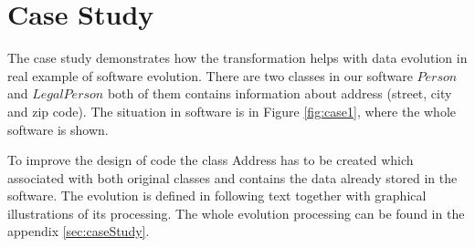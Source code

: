 \documentclass[11pt]{article}
\begin{document}
 
\section{Case Study}
The case study demonstrates how the transformation helps with data evolution in real example of software evolution. There are two classes in our software $Person$ and $LegalPerson$ both of them contains information about address (street, city and zip code). The situation in software is in Figure \ref{fig:case1}, where the whole software is shown. 

To improve the design of code the class Address has to be created which associated with both original classes and contains the data already stored in the software. The evolution is defined in following text together with graphical illustrations of its processing. The whole evolution processing can be found in the appendix \ref{sec:caseStudy}.
\end{document}
